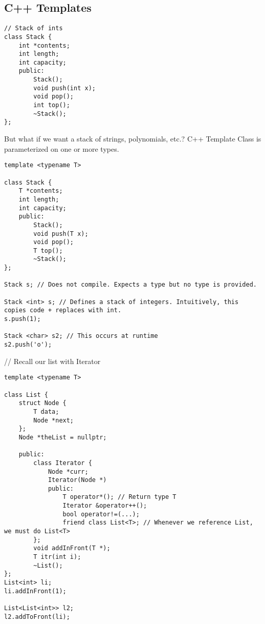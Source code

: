 \documentclass[12pt]{article}
\begin{document}
\subsection{C++ Templates}
\begin{lstlisting}
// Stack of ints
class Stack {
    int *contents;
    int length;
    int capacity;
    public:
        Stack();
        void push(int x);
        void pop();
        int top();
        ~Stack();
};
\end{lstlisting}
But what if we want a stack of strings, polynomials, etc.?
C++ Template Class is parameterized on one or more types.
\begin{lstlisting}
template <typename T>

class Stack {
    T *contents;
    int length;
    int capacity;
    public:
        Stack();
        void push(T x);
        void pop();
        T top();
        ~Stack();
};

Stack s; // Does not compile. Expects a type but no type is provided.

Stack <int> s; // Defines a stack of integers. Intuitively, this copies code + replaces with int.
s.push(1);

Stack <char> s2; // This occurs at runtime
s2.push('o');

\end{lstlisting}
//
Recall our list with Iterator
\begin{lstlisting}
template <typename T>

class List {
    struct Node {
        T data;
        Node *next;
    };
    Node *theList = nullptr;
    
    public: 
        class Iterator {
            Node *curr;
            Iterator(Node *)
            public:
                T operator*(); // Return type T
                Iterator &operator++();
                bool operator!=(...);
                friend class List<T>; // Whenever we reference List, we must do List<T>
        };
        void addInFront(T *);
        T itr(int i);
        ~List();
};
List<int> li;
li.addInFront(1);

List<List<int>> l2;
l2.addToFront(li);
\end{lstlisting}
\end{document}
